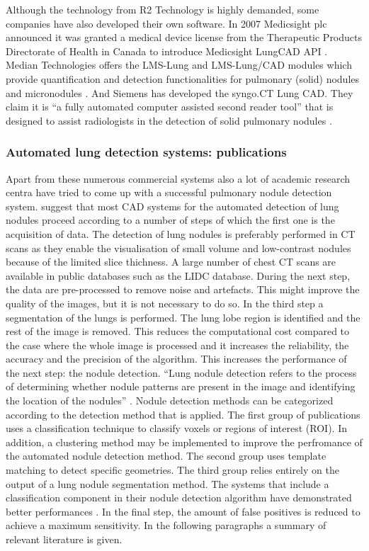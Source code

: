 Although the technology from R2 Technology is highly demanded, some companies
have also developed their own software. In 2007 Medicsight plc announced it was
granted a medical device license from the Therapeutic Products Directorate of
Health in Canada to introduce Medicsight LungCAD API \cite{HI}.
Median Technologies offers the LMS-Lung and LMS-Lung/CAD modules which provide
quantification and detection functionalities for pulmonary (solid) nodules and
micronodules \cite{median}. And Siemens has developed the syngo.CT Lung CAD.
They claim it is ``a fully automated computer assisted second reader tool'' that is designed to assist radiologists in
the detection of solid pulmonary nodules \cite{siemens}.

\subsubsection{Automated lung detection systems: publications}
Apart from these numerous commercial systems also a lot of academic research
centra have tried to come up with a successful pulmonary nodule detection
system. \cite{review} suggest that most CAD systems for the automated detection
of lung nodules proceed according to a number of steps of which the first one is
the acquisition of data. The detection of lung nodules is preferably performed
in CT scans as they enable the visualisation of small volume and low-contrast
nodules because of the limited slice thichness. A large number of chest CT scans
are available in public databases such as the LIDC database. During the next
step, the data are pre-processed to remove noise and artefacts. This might
improve the quality of the images, but it is not necessary to do so. In the
third step a segmentation of the lungs is performed. The lung lobe region is
identified and the rest of the image is removed. This reduces the computational
cost compared to the case where the whole image is processed and it increases
the reliability, the accuracy and the precision of the algorithm. This
increases the performance of the next step: the nodule detection. ``Lung nodule
detection refers to the process of determining whether nodule patterns are
present in the image and identifying the location of the nodules''
\cite[p.~154]{review}. Nodule detection methods can be categorized according to
the detection method that is applied. The first group of publications uses a
classification technique to classify voxels or regions of interest (ROI). In
addition, a clustering method may be implemented to improve the perfromance of
the automated nodule detection method. The second group uses template matching
to detect specific geometries. The third group relies entirely on the output of
a lung nodule segmentation method. The systems that include a classification
component in their nodule detection algorithm have demonstrated better
performances \cite{review}. In the final step, the amount of false positives is
reduced to achieve a maximum sensitivity. In the following paragraphs a summary
of relevant literature is given.

